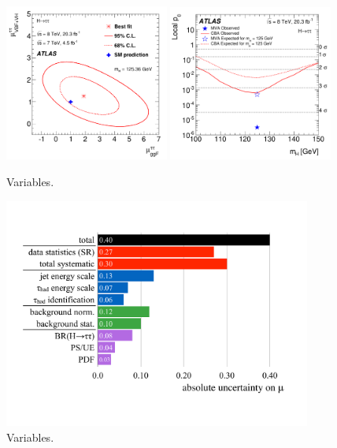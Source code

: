 \begin{figure}[tp]
  \centering
  \includegraphics[width=0.48\textwidth]{figures/HIGG-2013-32/fig_12}
  \includegraphics[width=0.48\textwidth]{figures/HIGG-2013-32/fig_14}
  \caption{Variables.}
  \label{fig:results-mup0}
\end{figure}

\begin{figure}[tp]
  \centering
  \includegraphics[width=0.90\textwidth]{figures/HIGG-2013-32/uncertainties}
  \caption{Variables.}
  \label{fig:results-uncertainties-1}
\end{figure}

